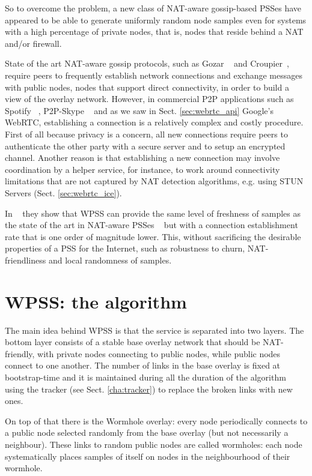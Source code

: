 So to overcome the problem, a new class of NAT-aware gossip-based PSSes have appeared to be able to generate uniformly random node samples even for systems with a high percentage of private nodes, that is, nodes that reside behind a NAT and/or firewall.

State of the art NAT-aware gossip protocols, such as Gozar ~\cite{gozar} and Croupier~\cite{croupier}, require peers to frequently establish network connections and exchange messages with public nodes, nodes that support direct connectivity, in order to build a view of the overlay network. However, in commercial P2P applications such as Spotify ~\cite{spotify}, P2P-Skype ~\cite{skype} and as we saw in Sect. \ref{sec:webrtc_api} Google’s WebRTC, establishing a connection is a relatively complex and costly procedure. First of all because privacy is a concern, all new connections require peers to authenticate the other party with a secure server and to setup an encrypted channel. Another reason is that establishing a new connection may involve coordination by a helper service, for instance, to work around connectivity limitations that are not captured by NAT detection algorithms, e.g. using STUN Servers (Sect. \ref{sec:webrtc_ice}). 

In ~\cite{wormhole} they show that WPSS can provide the same level of freshness of samples as the state of the art in NAT-aware PSSes ~\cite{croupier} but with a connection establishment rate that is one order of magnitude lower. This, without sacrificing the desirable properties of a PSS for the Internet, such as robustness to churn, NAT-friendliness and local randomness of samples.

\section{WPSS: the algorithm}
\label{sec:wpss_algorithm}
The main idea behind WPSS is that the service is separated into two layers. The bottom layer consists of a stable base overlay network that should be NAT-friendly, with private nodes connecting to public nodes, while public nodes connect to one another. The number of links in the base overlay is fixed at bootstrap-time and it is maintained during all the duration of the algorithm using the tracker (see Sect. \ref{cha:tracker}) to replace the broken links with new ones.

On top of that there is the Wormhole overlay: every node periodically connects to a public node selected randomly from the base overlay (but not necessarily a neighbour). These links to random public nodes are called wormholes: each node systematically places samples of itself on nodes in the neighbourhood of their wormhole. 

